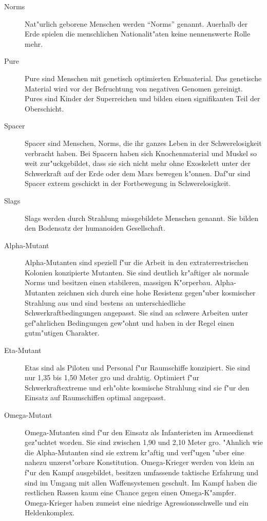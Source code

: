 \begin{description}
\item [Norms] Nat"urlich geborene Menschen werden ``Norms'' genannt. Au\3erhalb der Erde spielen die menschlichen Nationalit"aten 
      keine nennenswerte Rolle mehr.
\item [Pure] Pure sind Menschen mit genetisch optimierten Erbmaterial. Das genetische Material wird vor der
      Befruchtung von negativen Genomen gereinigt. Pures sind Kinder der Superreichen und bilden einen signifikanten Teil der Oberschicht.
\item [Spacer] Spacer sind Menschen, Norms, die ihr ganzes Leben in der Schwerelosigkeit verbracht haben. Bei Spacern haben
      sich Knochenmaterial und Muskel so weit zur"uckgebildet, dass sie sich nicht mehr ohne Exoskelett unter der Schwerkraft auf der Erde oder dem Mars bewegen k"onnen. Daf"ur sind Spacer extrem geschickt in der Fortbewegung in Schwerelosigkeit.
\item [Slags] Slags werden durch Strahlung missgebildete Menschen genannt. Sie bilden den Bodensatz der humanoiden Gesellschaft.
\item [Alpha-Mutant] Alpha-Mutanten sind speziell f"ur die Arbeit in den extraterrestrischen Kolonien konzipierte Mutanten. Sie sind 
      deutlich kr"aftiger als normale Norms und besitzen einen stabileren, massigen K"orperbau. Alpha-Mutanten zeichnen sich durch eine hohe Resistenz gegen"uber kosmischer Strahlung aus und sind bestens an unterschiedliche Schwerkraftbedingungen angepasst. Sie sind an schwere Arbeiten unter gef"ahrlichen Bedingungen gew"ohnt und haben in der Regel einen gutm"utigen Charakter.
\item [Eta-Mutant] Etas sind als Piloten und Personal f"ur Raumschiffe konzipiert. Sie sind nur 1,35 bis 1,50 Meter gro\3
      und drahtig. Optimiert f"ur Schwerkraftextreme und erh"ohte kosmische Strahlung sind sie f"ur den Einsatz auf Raumschiffen optimal angepasst.
\item [Omega-Mutant] Omega-Mutanten sind f"ur den Einsatz als Infanteristen im Armeedienst gez"uchtet worden. Sie sind zwischen 1,90 und 
      2,10 Meter gro\3. "Ahnlich wie die Alpha-Mutanten sind sie extrem kr"aftig und verf"ugen "uber eine nahezu unzerst"orbare Konstitution. Omega-Krieger werden von klein an f"ur den Kampf ausgebildet, besitzen umfassende taktische Erfahrung und sind im Umgang mit allen Waffensystemen geschult. Im Kampf haben die restlichen Rassen kaum eine Chance gegen einen Omega-K"ampfer. Omega-Krieger haben zumeist eine niedrige Agressionsschwelle und ein Heldenkomplex.
\end{description}

